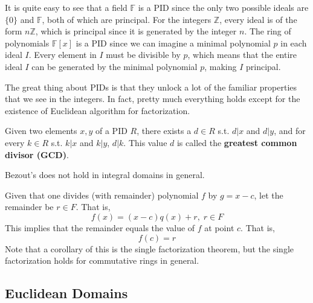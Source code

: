   It is quite easy to see that a field $\mathbb{F}$ is a PID since the only two possible ideals are $\{0\}$ and $\mathbb{F}$, both of which are principal. For the integers $\mathbb{Z}$, every ideal is of the form $n\mathbb{Z}$, which is principal since it is generated by the integer $n$. The ring of polynomials $\mathbb{F}[x]$ is a PID since we can imagine a minimal polynomial $p$ in each ideal $I$. Every element in $I$ must be divisible by $p$, which means that the entire ideal $I$ can be generated by the minimal polynomial $p$, making $I$ principal.  

  The great thing about PIDs is that they unlock a lot of the familiar properties that we see in the integers. In fact, pretty much everything holds except for the existence of Euclidean algorithm for factorization. 

  \begin{theorem}
    Given two elements $x, y$ of a PID $R$, there exists a $d \in R$ s.t. $d | x$ and $d | y$, and for every $k \in R$ s.t. $k | x$ and $k | y$, $d | k$. This value $d$ is called the \textbf{greatest common divisor (GCD)}. 
  \end{theorem}

  \begin{theorem}
    
  \end{theorem}

  Bezout's does not hold in integral domains in general. 

  \begin{theorem}
    Given that one divides (with remainder) polynomial $f$ by $g = x - c$, let the remainder be $r \in F$. That is, 
    \begin{equation}
      f(x) = (x-c) q(x) + r, \; r \in F
    \end{equation}
    This implies that the remainder equals the value of $f$ at point $c$. That is, 
    \begin{equation}
      f(c) = r
    \end{equation}
    Note that a corollary of this is the single factorization theorem, but the single factorization holds for commutative rings in general. 
  \end{theorem} 

\subsection{Euclidean Domains}


